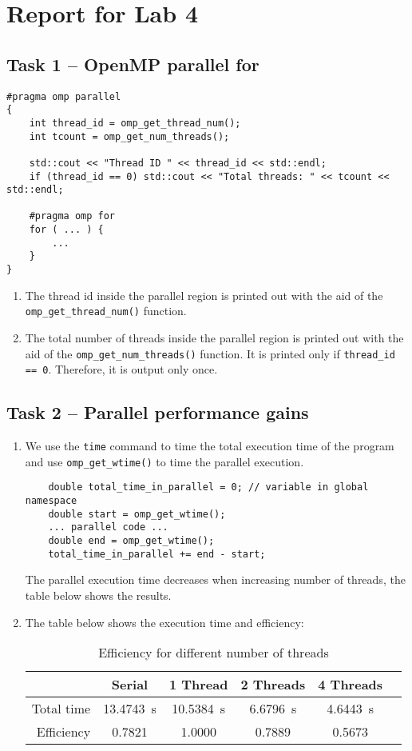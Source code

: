 \documentclass[a4paper, DIV12, headsepline]{scrartcl}
\begin{document}
\section*{Report for Lab 4}
\subsection*{Task 1 -- OpenMP parallel for}
\begin{verbatim}
#pragma omp parallel
{
    int thread_id = omp_get_thread_num();
    int tcount = omp_get_num_threads();

    std::cout << "Thread ID " << thread_id << std::endl;
    if (thread_id == 0) std::cout << "Total threads: " << tcount << std::endl;

    #pragma omp for
    for ( ... ) {
        ...
    }
}
\end{verbatim}
\begin{enumerate}
\item The thread id inside the parallel region is printed out with the aid of the \texttt{omp\_get\_thread\_num()} function.

\item The total number of threads inside the parallel region is printed out with the aid of the \verb|omp_get_num_threads()| function. It is printed only if \verb|thread_id == 0|. Therefore, it is output only once.
\end{enumerate}


\subsection*{Task 2 -- Parallel performance gains}
\begin{enumerate}
\item We use the \texttt{time} command to time the total execution time of the program and use \texttt{omp\_get\_wtime()} to time the parallel execution. 
\begin{verbatim}
    double total_time_in_parallel = 0; // variable in global namespace
    double start = omp_get_wtime();
    ... parallel code ...
    double end = omp_get_wtime();
    total_time_in_parallel += end - start;
\end{verbatim}
The parallel execution time decreases when increasing number of threads, the table below shows the results.

\item The table below shows the execution time and efficiency:
\begin{table}[htbp]
\centering
{}
\begin{tabular}{rSSSSS}
\hline
& {Serial} & {1 Thread} & {2 Threads} & {4 Threads} \\
\hline
Total time & \SI{13.4743}{s}  & \SI{10.5384}{s}  & \SI{6.6796}{s}  &\SI{4.6443}{s}   \\
Efficiency & \SI{0.7821}{} & \SI{1.0000}{} & \SI{0.7889}{} & \SI{0.5673}{} \\
\hline
\end{tabular}
\caption{Efficiency for different number of threads}
\label{tab:tab22}
\end{table}
\end{enumerate}
\end{document}
